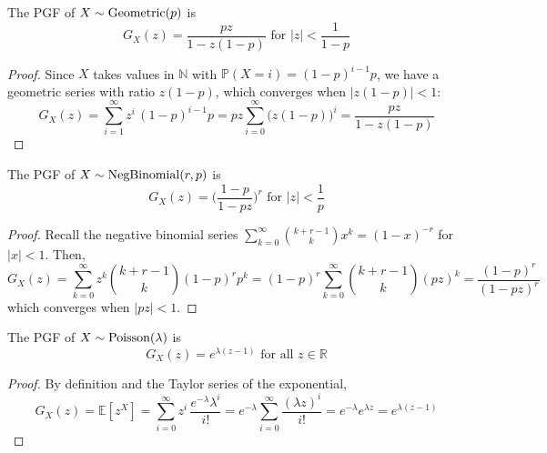 	\begin{theorem}
	  \label{thm:pgf-of-geometric-distribution}
		The PGF of \hyperref[def:geometric-random-variable]{$X \sim \operatorname{Geometric}(p)$} is 
		\begin{equation}
			G_X (z) = \frac{p z}{1 - z(1 - p)} \text{ for } |z| < \frac{1}{1 - p}
		\end{equation}
	\end{theorem}
	\begin{proof}
		Since $X$ takes values in $\mathbb{N}$ with $\mathbb{P}(X = i) = (1-p)^{i-1} p$, we have a geometric series with ratio $z(1-p)$, which converges when $|z(1-p)| < 1$: 
		\begin{equation}
			G_X (z) = \sum_{i=1}^\infty z^i \, (1 - p)^{i-1} p = p z \sum_{i=0}^\infty \big( z (1 - p) \big)^i = \frac{p z}{1 - z(1 - p)}
		\end{equation}
	\end{proof}

	\begin{theorem}
	  \label{thm:pgf-of-negative-binomial-distribution}
		The PGF of \hyperref[def:negative-binomial-distribution]{$X \sim \operatorname{NegBinomial}(r, p)$} is 
		\begin{equation}
			G_X (z) = \bigg( \frac{1 - p}{1 - p z} \bigg)^r \text{ for } |z| < \frac{1}{p}
		\end{equation}
	\end{theorem}
	\begin{proof}
		Recall the negative binomial series $\sum_{k=0}^\infty \binom{k + r - 1}{k} x^k = (1 - x)^{-r}$ for $|x| < 1$. Then, 
		\begin{equation}
			G_X (z) = \sum_{k=0}^\infty z^k \binom{k + r - 1}{k} (1 - p)^r p^k = (1 - p)^r \sum_{k=0}^\infty \binom{k + r - 1}{k} (p z)^k = \frac{(1 - p)^r}{(1 - p z)^r}
		\end{equation}
		which converges when $|p z| < 1$. 
	\end{proof}

	\begin{theorem}
	  \label{thm:pgf-of-poisson-distribution}
		The PGF of \hyperref[def:poisson-random-variable]{$X \sim \operatorname{Poisson}(\lambda)$} is 
		\begin{equation}
			G_X (z) = e^{\lambda(z - 1)} \text{ for all } z \in \mathbb{R}
		\end{equation}
	\end{theorem}
	\begin{proof}
		By definition and the Taylor series of the exponential, 
		\begin{equation}
			G_X (z) = \mathbb{E}[z^X] = \sum_{i=0}^\infty z^i \, \frac{e^{-\lambda} \lambda^i}{i!} = e^{-\lambda} \sum_{i=0}^\infty \frac{(\lambda z)^i}{i!} = e^{-\lambda} e^{\lambda z} = e^{\lambda(z - 1)}
		\end{equation}
	\end{proof}

